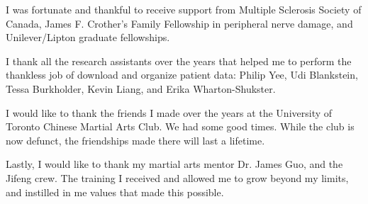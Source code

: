 I was fortunate and thankful to receive support from Multiple Sclerosis Society of Canada, James F. Crother's Family Fellowship in peripheral nerve damage, and Unilever/Lipton graduate fellowships. 

I thank all the research assistants over the years that helped me to perform the thankless job of download and organize patient data: Philip Yee, Udi Blankstein, Tessa Burkholder, Kevin Liang, and Erika Wharton-Shukster. 

I would like to thank the friends I made over the years at the University of Toronto Chinese Martial Arts Club. We had some good times. While the club is now defunct, the friendships made there will last a lifetime. 

Lastly, I would like to thank my martial arts mentor Dr. James Guo, and the Jifeng crew. The training I received and allowed me to grow beyond my limits, and instilled in me values that made this possible.